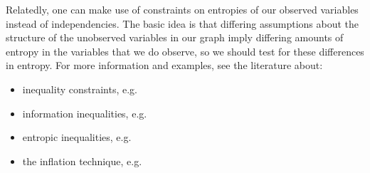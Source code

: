 Relatedly, one can make use of constraints on entropies of our observed variables instead of independencies.
The basic idea is that differing assumptions about the structure of the unobserved variables in our graph imply differing amounts of entropy in the variables that we do observe, so we should test for these differences in entropy.
For more information and examples, see the literature about:
\begin{itemize}
  \item inequality constraints, e.g. \citet{tian_2002_testable, kang_2006_inequality, ver_2011_sequence}
  \item information inequalities, e.g. \citet{chaves_2014_inferring}
  \item entropic inequalities, e.g. \citet{chaves_2014_causal}
  \item the inflation technique, e.g. \citet{wolfe_2019_inflation, navascues_2020_inflation}
\end{itemize}
